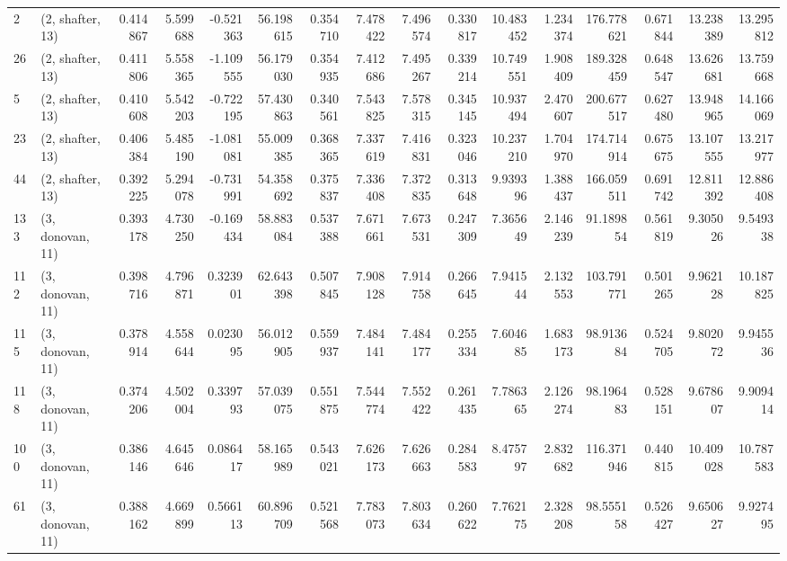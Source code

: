 \begin{tabular}{llrrrrrrrrrrrrrr}
2   &  (2, shafter, 13) &   0.414867 &   5.599688 & -0.521363 &   56.198615 &  0.354710 &   7.478422 &   7.496574 &  0.330817 &  10.483452 &   1.234374 &  176.778621 &  0.671844 &  13.238389 &  13.295812 \\
26  &  (2, shafter, 13) &   0.411806 &   5.558365 & -1.109555 &   56.179030 &  0.354935 &   7.412686 &   7.495267 &  0.339214 &  10.749551 &   1.908409 &  189.328459 &  0.648547 &  13.626681 &  13.759668 \\
5   &  (2, shafter, 13) &   0.410608 &   5.542203 & -0.722195 &   57.430863 &  0.340561 &   7.543825 &   7.578315 &  0.345145 &  10.937494 &   2.470607 &  200.677517 &  0.627480 &  13.948965 &  14.166069 \\
23  &  (2, shafter, 13) &   0.406384 &   5.485190 & -1.081081 &   55.009385 &  0.368365 &   7.337619 &   7.416831 &  0.323046 &  10.237210 &   1.704970 &  174.714914 &  0.675675 &  13.107555 &  13.217977 \\
44  &  (2, shafter, 13) &   0.392225 &   5.294078 & -0.731991 &   54.358692 &  0.375837 &   7.336408 &   7.372835 &  0.313648 &   9.939396 &   1.388437 &  166.059511 &  0.691742 &  12.811392 &  12.886408 \\
133 &  (3, donovan, 11) &   0.393178 &   4.730250 & -0.169434 &   58.883084 &  0.537388 &   7.671661 &   7.673531 &  0.247309 &   7.365649 &   2.146239 &   91.189854 &  0.561819 &   9.305026 &   9.549338 \\
112 &  (3, donovan, 11) &   0.398716 &   4.796871 &  0.323901 &   62.643398 &  0.507845 &   7.908128 &   7.914758 &  0.266645 &   7.941544 &   2.132553 &  103.791771 &  0.501265 &   9.962128 &  10.187825 \\
115 &  (3, donovan, 11) &   0.378914 &   4.558644 &  0.023095 &   56.012905 &  0.559937 &   7.484141 &   7.484177 &  0.255334 &   7.604685 &   1.683173 &   98.913684 &  0.524705 &   9.802072 &   9.945536 \\
118 &  (3, donovan, 11) &   0.374206 &   4.502004 &  0.339793 &   57.039075 &  0.551875 &   7.544774 &   7.552422 &  0.261435 &   7.786365 &   2.126274 &   98.196483 &  0.528151 &   9.678607 &   9.909414 \\
100 &  (3, donovan, 11) &   0.386146 &   4.645646 &  0.086417 &   58.165989 &  0.543021 &   7.626173 &   7.626663 &  0.284583 &   8.475797 &   2.832682 &  116.371946 &  0.440815 &  10.409028 &  10.787583 \\
61  &  (3, donovan, 11) &   0.388162 &   4.669899 &  0.566113 &   60.896709 &  0.521568 &   7.783073 &   7.803634 &  0.260622 &   7.762175 &   2.328208 &   98.555158 &  0.526427 &   9.650627 &   9.927495 \\

\end{tabular}
